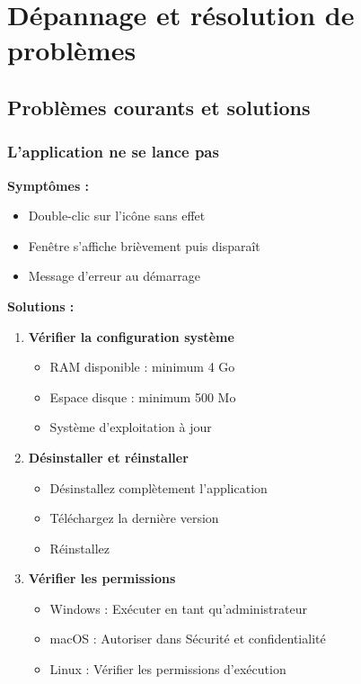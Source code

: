 \section{Dépannage et résolution de problèmes}

\subsection{Problèmes courants et solutions}

\subsubsection{L'application ne se lance pas}

\textbf{Symptômes :}
\begin{itemize}[leftmargin=*]
    \item Double-clic sur l'icône sans effet
    \item Fenêtre s'affiche brièvement puis disparaît
    \item Message d'erreur au démarrage
\end{itemize}

\textbf{Solutions :}
\begin{enumerate}[leftmargin=*]
    \item \textbf{Vérifier la configuration système}
    \begin{itemize}
        \item RAM disponible : minimum 4 Go
        \item Espace disque : minimum 500 Mo
        \item Système d'exploitation à jour
    \end{itemize}

    \item \textbf{Désinstaller et réinstaller}
    \begin{itemize}
        \item Désinstallez complètement l'application
        \item Téléchargez la dernière version
        \item Réinstallez
    \end{itemize}

    \item \textbf{Vérifier les permissions}
    \begin{itemize}
        \item Windows : Exécuter en tant qu'administrateur
        \item macOS : Autoriser dans Sécurité et confidentialité
        \item Linux : Vérifier les permissions d'exécution
    \end{itemize}
\end{enumerate}

